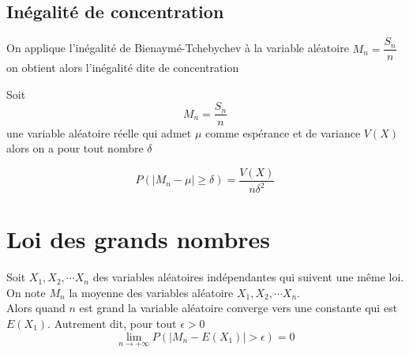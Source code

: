 \documentclass[french]{book}
\newcommand{\se}{\geq}
\newcommand{\limn}{\lim_{n\rightarrow +\infty}}
\begin{document}
\subsection{Inégalité de concentration}
 On applique l'inégalité de Bienaymé-Tchebychev à la variable aléatoire $M_n=\dfrac{S_n}{n}$ on obtient alors l'inégalité dite de concentration
 
\begin{prop} 
Soit $$M_n=\dfrac{S_n}{n}$$ une variable aléatoire réelle qui admet $\mu$ comme espérance et de variance $V(X)$ alors on a pour tout nombre $\delta$ 

$$P(\vert M_n-\mu \vert \se \delta)=\dfrac{V(X)}{n \delta^2}$$
\end{prop}
\section{Loi des grands nombres}
\begin{thm}
Soit $X_1,X_2,\cdots X_n$ des variables aléatoires indépendantes qui suivent une même loi. On note $M_n$ la moyenne des variables aléatoire $X_1,X_2,\cdots X_n$. \\

Alors quand $n$ est grand la variable aléatoire converge vers une constante qui est $E(X_1)$. Autrement dit, pour tout $\epsilon>0$
$$ \limn P(\vert M_n - E(X_1) \vert > \epsilon) = 0$$
\end{thm}

 
 
\end{document}
